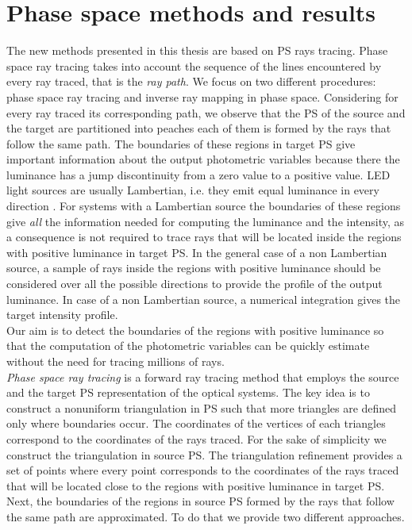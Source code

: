 \section{Phase space methods and results}
The new methods presented in this thesis are based on PS rays tracing.
Phase space ray tracing takes into account the sequence of the lines encountered by every ray traced, that is the \textit{ray path}. We focus on two different procedures: phase space ray tracing and inverse ray mapping in phase space. 
Considering for every ray traced its corresponding path, we observe that the PS of the source and the target are partitioned into peaches each of them is formed by the rays that follow the same path. The boundaries of these regions in target PS give important information about the output photometric variables because there the luminance has a jump discontinuity from a zero value to a positive value. LED light sources are usually Lambertian, i.e. they emit equal luminance in every direction \cite{taylor2000illumination}. For systems with a Lambertian source the boundaries of these regions give \textit{all} the information needed for computing the luminance and the intensity, as a consequence is not required to trace rays that will be located inside the regions with positive luminance in target PS.
In the general case of a non Lambertian source, a sample of rays inside the regions with positive luminance should be considered over all the possible directions to provide the profile of the output luminance. In case of a non Lambertian source, a numerical integration gives the target intensity profile. 
\\ \indent 
Our aim is to detect the boundaries of the regions with positive luminance so that the computation of the photometric variables can be quickly estimate without the need for tracing millions of rays. \\ \indent
\textit{Phase space ray tracing} is a forward ray tracing method that employs the source and the target PS representation of the optical systems. The key idea is to construct a nonuniform triangulation in PS such that more triangles are defined only where boundaries occur. The coordinates of the vertices of each triangles correspond to the coordinates of the rays traced.  For the sake of simplicity we construct the triangulation in source PS. The triangulation refinement provides a set of points where every point corresponds to the coordinates of the rays traced that will be located close to the regions with positive luminance in target PS. Next, the boundaries of the regions in source PS formed by the rays that follow the same path are approximated. To do that we provide two different approaches. \\ \indent
